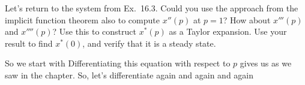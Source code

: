 Let's return to the system from Ex.~16.3. Could you use the approach from the implicit function theorem also to compute $x''(p)$ at $p=1$? How about $x'''(p)$ and $x''''(p)$? Use this to construct $x^*(p)$ as a Taylor expansion. Use your result to find $x^*(0)$, and verify that it is a steady state.    

\solution 
So we start with 
Differentiating this equation with respect to $p$ gives us 
as we saw in the chapter. So, let's differentiate again 
and again 
and again 

